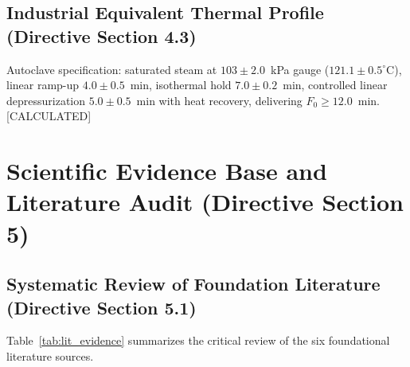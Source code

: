 \documentclass[10pt,a4paper]{article}
\newcommand{\epistag}[1]{\textsf{\scriptsize\textcolor{fnqslate}{[#1]}}}
\begin{document}
\subsection{Industrial Equivalent Thermal Profile (Directive Section 4.3)}
Autoclave specification: saturated steam at $103 \pm 2.0$~kPa gauge ($121.1 \pm 0.5^\circ\mathrm{C}$), linear ramp-up $4.0 \pm 0.5$~min, isothermal hold $7.0 \pm 0.2$~min, controlled linear depressurization $5.0 \pm 0.5$~min with heat recovery, delivering $F_0 \ge 12.0$~min. \epistag{CALCULATED}

\section{Scientific Evidence Base and Literature Audit (Directive Section 5)}

\subsection{Systematic Review of Foundation Literature (Directive Section 5.1)}
Table~\ref{tab:lit_evidence} summarizes the critical review of the six foundational literature sources.
\end{document}
